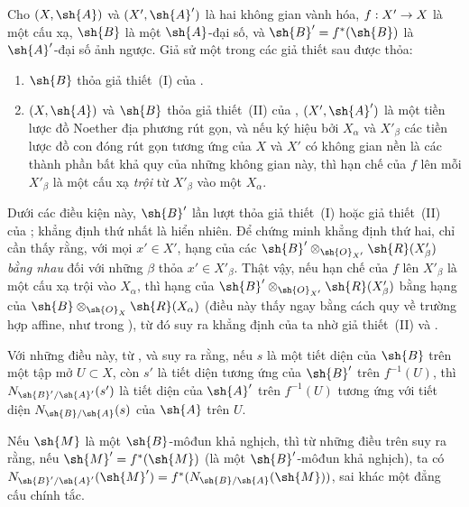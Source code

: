 \documentclass[oneside,10pt]{amsart}
\makeatletter
\newcommand{\ega@arrow}[2]{\mathchoice{#1}{#2}{#2}{#2}}
\renewcommand{\to}{\ega@arrow{\longrightarrow}{\rightarrow}}
\newcommand{\oldpage}[2][]{\marginnote{\normalfont\footnotesize\textbf{#1}~|~#2}\ignorespaces}
\let\EGAOriginalLabel\label
\renewcommand{\label}[1]{\phantomsection\EGAOriginalLabel{#1}}
\makeatother
\begin{document}
\begin{env}[6.5.4]
\label{II.6.5.4}
Cho $(X,\sh{A})$ và $(X',\sh{A}')$ là hai không gian vành hóa, $f:X'\to X$ là một cấu xạ, $\sh{B}$ là một $\sh{A}$-đại số, và $\sh{B}'=f^*(\sh{B})$ là $\sh{A}'$-đại số ảnh ngược.
Giả sử một trong các giả thiết sau được thỏa:
\begin{enumerate}
  \item $\sh{B}$ thỏa giả thiết~(I) của .
  \item $(X,\sh{A})$ và $\sh{B}$ thỏa giả thiết~(II) của , $(X',\sh{A}')$ là một tiền lược đồ Noether địa phương rút gọn, và nếu ký hiệu bởi $X_\alpha$ và $X'_\beta$ các tiền lược đồ con đóng rút gọn tương ứng của $X$ và $X'$ có không gian nền là các thành phần bất khả quy của những không gian này, thì hạn chế của $f$ lên mỗi $X'_\beta$ là một cấu xạ \emph{trội} từ $X'_\beta$ vào một $X_\alpha$.
\end{enumerate}

Dưới các điều kiện này, $\sh{B}'$ lần lượt thỏa giả thiết~(I) hoặc giả thiết~(II) của ; khẳng định thứ nhất là hiển nhiên.
Để chứng minh khẳng định thứ hai, chỉ cần thấy rằng, với mọi $x'\in X'$, hạng của các $\sh{B}'\otimes_{\sh{O}_{X'}}\sh{R}(X'_\beta)$ \emph{bằng nhau} đối với những $\beta$ thỏa $x'\in X'_\beta$.
Thật vậy, nếu hạn chế của $f$ lên $X'_\beta$ là một cấu xạ trội vào $X_\alpha$, thì hạng của $\sh{B}'\otimes_{\sh{O}_{X'}}\sh{R}(X'_\beta)$ bằng hạng của $\sh{B}\otimes_{\sh{O}_X}\sh{R}(X_\alpha)$ (điều này thấy ngay bằng cách quy về
\oldpage[II]{129}
trường hợp affine, như trong ), từ đó suy ra khẳng định của ta nhờ giả thiết~(II) và .

Với những điều này, từ ,  và  suy ra rằng, nếu $s$ là một tiết diện của $\sh{B}$ trên một tập mở $U\subset X$, còn $s'$ là tiết diện tương ứng của $\sh{B}'$ trên $f^{-1}(U)$, thì $N_{\sh{B}'/\sh{A}'}(s')$ là tiết diện của $\sh{A}'$ trên $f^{-1}(U)$ tương ứng với tiết diện $N_{\sh{B}/\sh{A}}(s)$ của $\sh{A}$ trên $U$.

Nếu $\sh{M}$ là một $\sh{B}$-môđun khả nghịch, thì từ những điều trên suy ra rằng, nếu $\sh{M}'=f^*(\sh{M})$ (là một $\sh{B}'$-môđun khả nghịch), ta có $N_{\sh{B}'/\sh{A}'}(\sh{M}')=f^*(N_{\sh{B}/\sh{A}}(\sh{M}))$, sai khác một đẳng cấu chính tắc.
\end{env}
\end{document}
